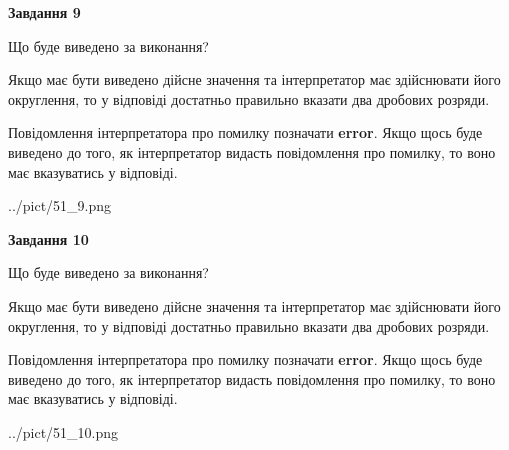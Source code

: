 \documentclass[12pt, ukrainian]{article}
\begin{document}
{\begin {Large}
{\begin {center}\textbf{Завдання 9}\end {center}}\par
Що буде виведено за виконання? \par

Якщо має бути виведено дійсне значення та інтерпретатор має здійснювати його округлення, 
то у відповіді достатньо правильно вказати два дробових розряди.

Повідомлення інтерпретатора про помилку позначати \textbf{error}.
Якщо щось буде виведено до того, як інтерпретатор видасть повідомлення про помилку, 
то воно має вказуватись у відповіді. \par

\begin{center}
	{../pict/51_9.png}
\end{center}
\newpage

{\begin {center}\textbf{Завдання 10}\end {center}}\par
Що буде виведено за виконання? \par

Якщо має бути виведено дійсне значення та інтерпретатор має здійснювати його округлення, 
то у відповіді достатньо правильно вказати два дробових розряди.

Повідомлення інтерпретатора про помилку позначати \textbf{error}.
Якщо щось буде виведено до того, як інтерпретатор видасть повідомлення про помилку, 
то воно має вказуватись у відповіді. \par

\begin{center}
	{../pict/51_10.png}
\end{center}
\newpage

\end {Large}}
\end{document}
